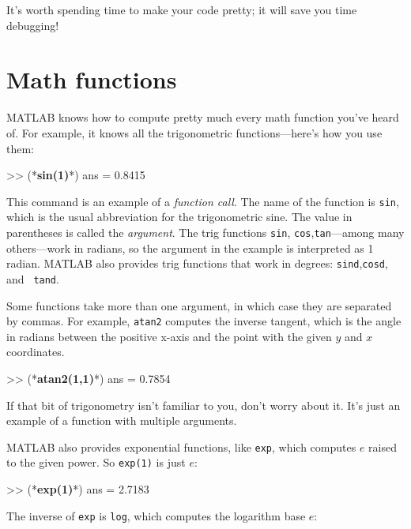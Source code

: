 It's worth spending time to make your code pretty; it will save
you time debugging!


\section{Math functions}

MATLAB knows how to compute pretty much every math function you've
heard of. For example, it knows all the trigonometric functions---here's how you
use them:


\begin{code}
>> (*\textbf{sin(1)}*)
ans = 0.8415
\end{code}

This command is an example of a \emph{function call}.  The name of the
function is \lstinline{sin}, which is the usual abbreviation for the
trigonometric sine.  The value in parentheses is called the \emph{argument}.
The trig functions \lstinline{sin}, \lstinline{cos},\lstinline{tan}---among many
others---work in radians, so the argument in the example is interpreted as 1 radian.
MATLAB also provides trig functions that work in degrees: {\tt sind},{\tt cosd}, and {\tt
tand}.

Some functions take more than one argument, in which case they are
separated by commas.  For example, \lstinline{atan2} computes the inverse
tangent, which is the angle in radians between the positive x-axis and
the point with the given $y$ and $x$ coordinates.

\begin{code}
>> (*\textbf{atan2(1,1)}*)
ans = 0.7854
\end{code}

If that bit of trigonometry isn't familiar to you, don't worry about
it.  It's just an example of a function with multiple arguments.


MATLAB also provides exponential functions, like \lstinline{exp}, which computes $e$ raised to the given power.  So \lstinline{exp(1)} is just $e$:

\begin{code}
>> (*\textbf{exp(1)}*)
ans = 2.7183
\end{code}


The inverse of \lstinline{exp} is \lstinline{log}, which computes the logarithm base $e$:

